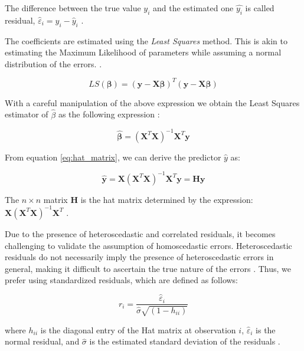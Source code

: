 \documentclass[12 pt]{scrartcl}
\numberwithin{equation}{section}
\begin{document}
The difference between the true value $y_{i}$ and the estimated one $\hat{y_{i}}$ is called residual, $\hat{\varepsilon}_{i} = y_{i} - \hat{y}_{i}$ \cite[p.77]{regression}.

The coefficients are estimated using the \textit{Least Squares} method. 
This is akin to estimating the Maximum Likelihood of parameters while assuming a normal distribution of the errors. \cite[p.105-106]{regression}. 

\begin{equation}
    LS(\boldsymbol{\beta}) = (\boldsymbol{y} - \boldsymbol{X}\boldsymbol{\beta})^T(\boldsymbol{y} - \boldsymbol{X}\boldsymbol{\beta})
\end{equation}

With a careful manipulation of the above expression we obtain 
the Least Squares estimator of $\hat{\beta}$ as the following expression \cite[p.107]{regression}:

\begin{equation}
    \hat{\boldsymbol{\beta}} = (\boldsymbol{X}^T\boldsymbol{X})^{-1}\boldsymbol{X}^T\boldsymbol{y}
    \label{eq:hat_matrix}
\end{equation}

From equation \ref{eq:hat_matrix}, we can derive the predictor $\hat{y}$ as:

\begin{equation}
    \hat{\boldsymbol{y}} = \boldsymbol{X}(\boldsymbol{X}^T\boldsymbol{X})^{-1}\boldsymbol{X}^T\boldsymbol{y} =  \boldsymbol{H}\boldsymbol{y}
\end{equation}

The $n \times n$ matrix $\boldsymbol{H}$ is the hat matrix determined by the expression: $\boldsymbol{X}(\boldsymbol{X}^T\boldsymbol{X})^{-1}\boldsymbol{X}^T$ \citep[p.108]{regression}.

Due to the presence of heteroscedastic and correlated residuals, it becomes challenging to validate the assumption of homoscedastic errors. 
Heteroscedastic residuals do not necessarily imply the presence of heteroscedastic errors in general, 
making it difficult to ascertain the true nature of the errors \citep[p.124]{regression}.
Thus, we prefer using standardized residuals, which are defined as follows:

\begin{equation*}
    r_{i} = \frac{\hat{\varepsilon}_{i}}{\hat{\sigma}\sqrt{(1-h_{ii})}}
\end{equation*}

where $h_{ii}$ is the diagonal entry of the Hat matrix at observation $i$, $\hat{\varepsilon}_{i}$
is the normal residual, and $\hat{\sigma}$ is the estimated standard deviation of the residuals \citep[p.124]{regression}.
\end{document}
